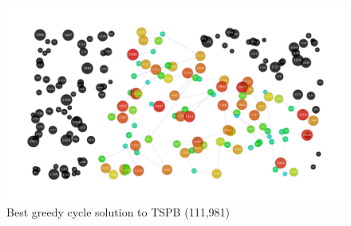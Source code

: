 \documentclass[14pt]{article}
\begin{document}
\begin{figure}[H]
	\begin{adjustwidth}{-3em}{0}
		\includegraphics{results/best_greedy-cycle_TSPB.pdf}
	\end{adjustwidth}
	\vspace{-15mm}
	\caption{Best greedy cycle solution to TSPB (111,981)}
\end{figure}
\end{document}
